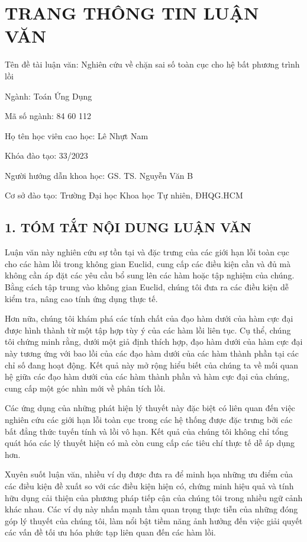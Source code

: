 \chapter*{TRANG THÔNG TIN LUẬN VĂN}

\begin{flushleft}
Tên đề tài luận văn: Nghiên cứu về chặn sai số toàn cục cho hệ bất phương trình lồi

Ngành: Toán Ứng Dụng

Mã số ngành: 84 60 112

Họ tên học viên cao học: Lê Nhựt Nam

Khóa đào tạo: 33/2023

Người hướng dẫn khoa học: GS. TS. Nguyễn Văn B

Cơ sở đào tạo: Trường Đại học Khoa học Tự nhiên, ĐHQG.HCM 
\end{flushleft}

\section*{1. TÓM TẮT NỘI DUNG LUẬN VĂN}

Luận văn này nghiên cứu sự tồn tại và đặc trưng của các giới hạn lỗi toàn cục cho các hàm lồi trong không gian Euclid, cung cấp các điều kiện cần và đủ mà không cần áp đặt các yêu cầu bổ sung lên các hàm hoặc tập nghiệm của chúng. Bằng cách tập trung vào không gian Euclid, chúng tôi đưa ra các điều kiện dễ kiểm tra, nâng cao tính ứng dụng thực tế.

Hơn nữa, chúng tôi khám phá các tính chất của đạo hàm dưới của hàm cực đại được hình thành từ một tập hợp tùy ý của các hàm lồi liên tục. Cụ thể, chúng tôi chứng minh rằng, dưới một giả định thích hợp, đạo hàm dưới của hàm cực đại này tương ứng với bao lồi của các đạo hàm dưới của các hàm thành phần tại các chỉ số đang hoạt động. Kết quả này mở rộng hiểu biết của chúng ta về mối quan hệ giữa các đạo hàm dưới của các hàm thành phần và hàm cực đại của chúng, cung cấp một góc nhìn mới về phân tích lồi.

Các ứng dụng của những phát hiện lý thuyết này đặc biệt có liên quan đến việc nghiên cứu các giới hạn lỗi toàn cục trong các hệ thống được đặc trưng bởi các bất đẳng thức tuyến tính và lồi vô hạn. Kết quả của chúng tôi không chỉ tổng quát hóa các lý thuyết hiện có mà còn cung cấp các tiêu chí thực tế dễ áp dụng hơn.

Xuyên suốt luận văn, nhiều ví dụ được đưa ra để minh họa những ưu điểm của các điều kiện đề xuất so với các điều kiện hiện có, chứng minh hiệu quả và tính hữu dụng cải thiện của phương pháp tiếp cận của chúng tôi trong nhiều ngữ cảnh khác nhau. Các ví dụ này nhấn mạnh tầm quan trọng thực tiễn của những đóng góp lý thuyết của chúng tôi, làm nổi bật tiềm năng ảnh hưởng đến việc giải quyết các vấn đề tối ưu hóa phức tạp liên quan đến các hàm lồi.

